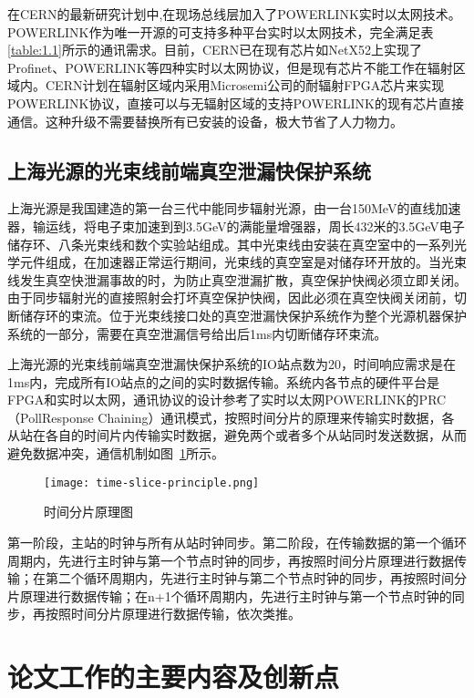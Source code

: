 在CERN的最新研究计划中,在现场总线层加入了POWERLINK实时以太网技术。POWERLINK作为唯一开源的可支持多种平台实时以太网技术，完全满足表\ref{table:1.1}所示的通讯需求。目前，CERN已在现有芯片如NetX52上实现了Profinet、POWERLINK等四种实时以太网协议，但是现有芯片不能工作在辐射区域内。CERN计划在辐射区域内采用Microsemi公司的耐辐射FPGA芯片来实现POWERLINK协议，直接可以与无辐射区域的支持POWERLINK的现有芯片直接通信。这种升级不需要替换所有已安装的设备，极大节省了人力物力。

\subsection{上海光源的光束线前端真空泄漏快保护系统}
上海光源是我国建造的第一台三代中能同步辐射光源，由一台150MeV的直线加速器，输运线，将电子束加速到到3.5GeV的满能量增强器，周长432米的3.5GeV电子储存环、八条光束线和数个实验站组成。其中光束线由安装在真空室中的一系列光学元件组成，在加速器正常运行期间，光束线的真空室是对储存环开放的。当光束线发生真空快泄漏事故的时，为防止真空泄漏扩散，真空保护快阀必须立即关闭。由于同步辐射光的直接照射会打坏真空保护快阀，因此必须在真空快阀关闭前，切断储存环的束流。位于光束线接口处的真空泄漏快保护系统作为整个光源机器保护系统的一部分，需要在真空泄漏信号给出后1ms内切断储存环束流。

上海光源的光束线前端真空泄漏快保护系统的IO站点数为20，时间响应需求是在1ms内，完成所有IO站点的之间的实时数据传输\cite{liu-2010}。系统内各节点的硬件平台是FPGA和实时以太网，通讯协议的设计参考了实时以太网POWERLINK的PRC（PollResponse Chaining）通讯模式，按照时间分片的原理来传输实时数据，各从站在各自的时间片内传输实时数据，避免两个或者多个从站同时发送数据，从而避免数据冲突，通信机制如图~\ref{fig:time-slice-principle}所示。

\begin{figure}[!htb]
	\centering
	\texttt{[image: time-slice-principle.png]}
	\caption{时间分片原理图}
	\label{fig:time-slice-principle}
\end{figure}

第一阶段，主站的时钟与所有从站时钟同步。第二阶段，在传输数据的第一个循环周期内，先进行主时钟与第一个节点时钟的同步，再按照时间分片原理进行数据传输；在第二个循环周期内，先进行主时钟与第二个节点时钟的同步，再按照时间分片原理进行数据传输；在n+1个循环周期内，先进行主时钟与第一个节点时钟的同步，再按照时间分片原理进行数据传输，依次类推。


\section{论文工作的主要内容及创新点}

